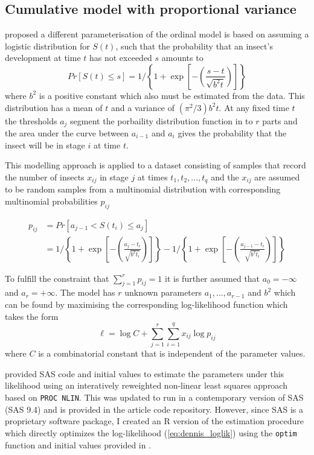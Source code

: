 \subsection{Cumulative model with proportional variance}
\citet{dennis1986stochastic} proposed a different parameterisation of the ordinal model is based on assuming a logistic distribution for $S(t)$, such that the probability that an insect's development at time $t$ has not exceeded $s$ amounts to 
\begin{equation}
Pr[S(t) \leq s] = 1 \bigg/ \left\{ 1 + \exp\left[-\left(\frac{s-t}{\sqrt{b^2t}}\right)\right]\right\}
\end{equation}
where $b^2$ is a positive constant which also must be estimated from the data. This distribution has a mean of $t$ and a variance of $(\pi^2/3)b^2t$.
At any fixed time $t$ the thresholds $a_j$ segment the porbaility distribution function in to $r$ parts and the area under the curve between $a_{i-1}$ and $a_i$ gives the probability that the insect will be in stage $i$ at time $t$.

This modelling approach is applied to a dataset consisting of samples that record the number of insects $x_{ij}$ in stage $j$ at times $t_1, t_2, \dots, t_q$ and the $x_{ij}$ are assumed to be random samples from a multinomial distribution with corresponding multinomial probabilities $p_{ij}$

\begin{align}
p_{ij} & = Pr[a_{j-1} < S(t_i) \leq a_{j}]\\
& = 1 \bigg/ \left\{ 1 + \exp\left[-\left(\frac{a_j-t_i}{\sqrt{b^2t_i}}\right)\right]\right\} - 1 \bigg/ \left\{ 1 + \exp\left[-\left(\frac{a_{j-1}-t_i}{\sqrt{b^2t_i}}\right)\right]\right\}\label{eq:dennis_cm}
\end{align}

To fulfill the constraint that $\sum_{j=1}^r p_{ij}= 1$ it is further assumed that $a_0 = -\infty$ and $a_r = +\infty$.
The model has $r$ unknown parameters $a_1, \dots, a_{r-1}$ and $b^2$ which can be found by maximising the corresponding log-likelihood function which takes the form 
\begin{equation}
\mathcal{\ell} = \log C + \sum_{j=1}^r \sum_{i=1}^q x_{ij} \log p_{ij}
\label{eq:dennis_loglik}
\end{equation}
where $C$ is a combinatorial constant that is independent of the parameter values.

\citet{dennis1986stochastic} provided SAS code and initial values to estimate the parameters under this likelihood using an interatively reweighted non-linear least squares approach based on \verb+PROC NLIN+. This was updated to run in a contemporary version of SAS (SAS 9.4) and is provided in the article code repository. However, since SAS is a proprietary software package, I created an R version of the estimation procedure which directly optimizes the log-likelihood (\ref{eq:dennis_loglik}) using the \verb+optim+ function and initial values provided in \citep{dennis1986stochastic}.

